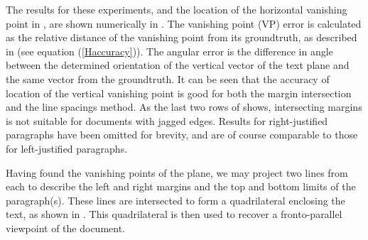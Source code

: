 
The results for these experiments, and the location of the horizontal vanishing
point in , are shown numerically in
. 
The vanishing point (VP) error is calculated as the relative distance of the
vanishing point from its groundtruth, as described in  (see equation (\ref{Haccuracy})). 
The angular error is the difference in angle between the determined orientation of the
vertical vector of the text plane and the same vector from the groundtruth.
It can be seen that the accuracy of location of the vertical vanishing point is
good for both the margin intersection and the line spacings method. 
As the last two rows of  shows, intersecting margins is not
suitable for documents with jagged edges.
Results for right-justified paragraphs have been omitted for brevity, and are of course
comparable to those for left-justified paragraphs.


Having found the vanishing points of the plane, we may project two lines from each
to describe the left and right margins and the top and bottom limits of the
paragraph(s). 
These lines are intersected to form a quadrilateral enclosing the text,
as shown in . %
This quadrilateral is then used to recover a fronto-parallel viewpoint
of the document.


